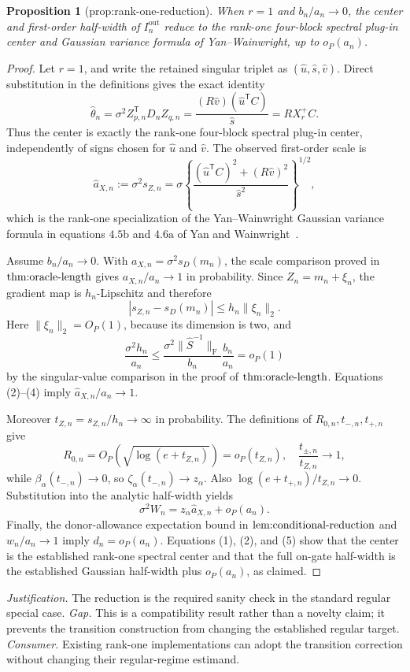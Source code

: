 \documentclass{article}
\newtheorem{proposition}{Proposition}
\begin{document}
\begin{proposition}[prop:rank-one-reduction]\label{prop:rank-one-reduction}
When \(r=1\) and \(b_n/a_n\to0\), the center and first-order half-width of \(I_n^{\mathrm{out}}\) reduce to the rank-one four-block spectral plug-in center and Gaussian variance formula of Yan--Wainwright, up to \(o_P(a_n)\).
\end{proposition}
\begin{proof}
Let \(r=1\), and write the retained singular triplet as \((\widehat u,\widehat s,\widehat v)\).  Direct substitution in the definitions gives the exact identity
\[
\widehat\theta_n
=\sigma^2Z_{p,n}^{\mathsf T}D_nZ_{q,n}
=\frac{(R\widehat v)(\widehat u^{\mathsf T}C)}{\widehat s}
=RX_r^+C.
\tag{1}
\]
Thus the center is exactly the rank-one four-block spectral plug-in center, independently of signs chosen for \(\widehat u\) and \(\widehat v\).  The observed first-order scale is
\[
\widehat a_{X,n}:=\sigma^2s_{Z,n}
=\sigma\left\{
\frac{(\widehat u^{\mathsf T}C)^2+(R\widehat v)^2}{\widehat s^2}
\right\}^{1/2},
\tag{2}
\]
which is the rank-one specialization of the Yan--Wainwright Gaussian variance formula in equations \(4.5\mathrm b\) and \(4.6\mathrm a\) of Yan and Wainwright~\cite{YanWainwright2024}.

Assume \(b_n/a_n\to0\).  With \(a_{X,n}=\sigma^2s_D(m_n)\), the scale comparison proved in \(\textup{thm:oracle-length}\) gives \(a_{X,n}/a_n\to1\) in probability.  Since \(Z_n=m_n+\xi_n\), the gradient map is \(h_n\)-Lipschitz and therefore
\[
|s_{Z,n}-s_D(m_n)|\le h_n\|\xi_n\|_2.
\tag{3}
\]
Here \(\|\xi_n\|_2=O_P(1)\), because its dimension is two, and
\[
\frac{\sigma^2h_n}{a_n}
\le\frac{\sigma^2\|\widehat S^{-1}\|_{\mathrm F}}{b_n}
\frac{b_n}{a_n}=o_P(1)
\tag{4}
\]
by the singular-value comparison in the proof of \(\textup{thm:oracle-length}\).  Equations (2)--(4) imply \(\widehat a_{X,n}/a_n\to1\).

Moreover \(t_{Z,n}=s_{Z,n}/h_n\to\infty\) in probability.  The definitions of \(R_{0,n},t_{-,n},t_{+,n}\) give
\[
R_{0,n}=O_P(\sqrt{\log(e+t_{Z,n})})=o_P(t_{Z,n}),
\quad
\frac{t_{\pm,n}}{t_{Z,n}}\to1,
\]
while \(\beta_\alpha(t_{-,n})\to0\), so \(\zeta_\alpha(t_{-,n})\to z_\alpha\).  Also \(\log(e+t_{+,n})/t_{Z,n}\to0\).  Substitution into the analytic half-width yields
\[
\sigma^2W_n=z_\alpha\widehat a_{X,n}+o_P(a_n).
\tag{5}
\]
Finally, the donor-allowance expectation bound in \(\textup{lem:conditional-reduction}\) and \(w_n/a_n\to1\) imply \(d_n=o_P(a_n)\).  Equations (1), (2), and (5) show that the center is the established rank-one spectral center and that the full on-gate half-width is the established Gaussian half-width plus \(o_P(a_n)\), as claimed.
\end{proof}
\par\smallskip\noindent \textit{Justification.} The reduction is the required sanity check in the standard regular special case. \textit{Gap.} This is a compatibility result rather than a novelty claim; it prevents the transition construction from changing the established regular target. \textit{Consumer.} Existing rank-one implementations can adopt the transition correction without changing their regular-regime estimand.
\end{document}
